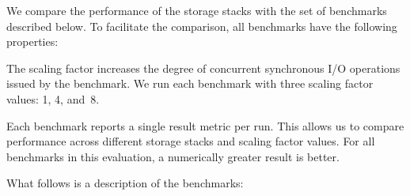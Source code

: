 \documentclass[12pt,a4paper,twoside]{book}
\begin{document}
We compare the performance of the storage stacks with the set of benchmarks described below.
To facilitate the comparison, all benchmarks have the following properties:
\begin{description}[noitemsep,leftmargin=1.5cm,labelindent=1cm]
    \item[Scaling Factor] The scaling factor increases the degree of concurrent synchronous I/O operations issued by the benchmark.
        We run each benchmark with three scaling factor values: 1, 4, and~8.
    \item[Result Metric] Each benchmark reports a single result metric per run.
        This allows us to compare performance across different storage stacks and scaling factor values.
        For all benchmarks in this evaluation, a numerically greater result is better.
\end{description}
What follows is a description of the benchmarks:
\end{document}
